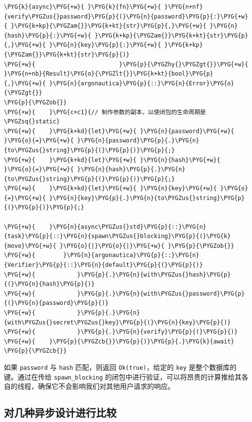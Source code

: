 \begin{Verbatim}[commandchars=\\\{\},breaklines=true,breakanywhere=true,fontsize=\codefont,xleftmargin=17bp]
\PYG{k}{async}\PYG{+w}{ }\PYG{k}{fn}\PYG{+w}{ }\PYG{n+nf}{verify\PYGZus{}password}\PYG{p}{(}\PYG{n}{password}\PYG{p}{:}\PYG{+w}{ }\PYG{k+kp}{\PYGZam{}}\PYG{k+kt}{str}\PYG{p}{,}\PYG{+w}{ }\PYG{n}{hash}\PYG{p}{:}\PYG{+w}{ }\PYG{k+kp}{\PYGZam{}}\PYG{k+kt}{str}\PYG{p}{,}\PYG{+w}{ }\PYG{n}{key}\PYG{p}{:}\PYG{+w}{ }\PYG{k+kp}{\PYGZam{}}\PYG{k+kt}{str}\PYG{p}{)}
\PYG{+w}{                        }\PYG{p}{\PYGZhy{}\PYGZgt{}}\PYG{+w}{ }\PYG{n+nb}{Result}\PYG{o}{\PYGZlt{}}\PYG{k+kt}{bool}\PYG{p}{,}\PYG{+w}{ }\PYG{n}{argonautica}\PYG{p}{::}\PYG{n}{Error}\PYG{o}{\PYGZgt{}}
\PYG{p}{\PYGZob{}}
\PYG{+w}{    }\PYG{c+c1}{// 制作参数的副本，以使闭包的生命周期是\PYGZsq{}static}
\PYG{+w}{    }\PYG{k+kd}{let}\PYG{+w}{ }\PYG{n}{password}\PYG{+w}{ }\PYG{o}{=}\PYG{+w}{ }\PYG{n}{password}\PYG{p}{.}\PYG{n}{to\PYGZus{}string}\PYG{p}{(}\PYG{p}{)}\PYG{p}{;}
\PYG{+w}{    }\PYG{k+kd}{let}\PYG{+w}{ }\PYG{n}{hash}\PYG{+w}{ }\PYG{o}{=}\PYG{+w}{ }\PYG{n}{hash}\PYG{p}{.}\PYG{n}{to\PYGZus{}string}\PYG{p}{(}\PYG{p}{)}\PYG{p}{;}
\PYG{+w}{    }\PYG{k+kd}{let}\PYG{+w}{ }\PYG{n}{key}\PYG{+w}{ }\PYG{o}{=}\PYG{+w}{ }\PYG{n}{key}\PYG{p}{.}\PYG{n}{to\PYGZus{}string}\PYG{p}{(}\PYG{p}{)}\PYG{p}{;}

\PYG{+w}{    }\PYG{n}{async\PYGZus{}std}\PYG{p}{::}\PYG{n}{task}\PYG{p}{::}\PYG{n}{spawn\PYGZus{}blocking}\PYG{p}{(}\PYG{k}{move}\PYG{+w}{ }\PYG{o}{|}\PYG{o}{|}\PYG{+w}{ }\PYG{p}{\PYGZob{}}
\PYG{+w}{        }\PYG{n}{argonautica}\PYG{p}{::}\PYG{n}{Verifier}\PYG{p}{::}\PYG{n}{default}\PYG{p}{(}\PYG{p}{)}
\PYG{+w}{            }\PYG{p}{.}\PYG{n}{with\PYGZus{}hash}\PYG{p}{(}\PYG{n}{hash}\PYG{p}{)}
\PYG{+w}{            }\PYG{p}{.}\PYG{n}{with\PYGZus{}password}\PYG{p}{(}\PYG{n}{password}\PYG{p}{)}
\PYG{+w}{            }\PYG{p}{.}\PYG{n}{with\PYGZus{}secret\PYGZus{}key}\PYG{p}{(}\PYG{n}{key}\PYG{p}{)}
\PYG{+w}{            }\PYG{p}{.}\PYG{n}{verify}\PYG{p}{(}\PYG{p}{)}
\PYG{+w}{    }\PYG{p}{\PYGZcb{}}\PYG{p}{)}\PYG{p}{.}\PYG{k}{await}
\PYG{p}{\PYGZcb{}}
\end{Verbatim}

如果 \texttt{password} 与 \texttt{hash} 匹配，则返回 \texttt{Ok(true)}，给定的 \texttt{key} 是整个数据库的键。通过在传给 \texttt{spawn\_blocking} 的闭包中进行验证，可以将昂贵的计算推给其各自的线程，确保它不会影响我们对其他用户请求的响应。

\subsection{对几种异步设计进行比较}

